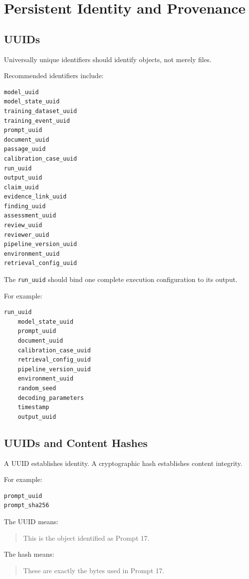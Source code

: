 \documentclass[11pt]{report}
\newcommand{\code}[1]{\texttt{#1}}
\begin{document}
\chapter{Persistent Identity and Provenance}

\section{UUIDs}

Universally unique identifiers should identify objects, not merely files.

Recommended identifiers include:

\begin{verbatim}
model_uuid
model_state_uuid
training_dataset_uuid
training_event_uuid
prompt_uuid
document_uuid
passage_uuid
calibration_case_uuid
run_uuid
output_uuid
claim_uuid
evidence_link_uuid
finding_uuid
assessment_uuid
review_uuid
reviewer_uuid
pipeline_version_uuid
environment_uuid
retrieval_config_uuid
\end{verbatim}

The \code{run\_uuid} should bind one complete execution configuration to its output.

For example:

\begin{verbatim}
run_uuid
    model_state_uuid
    prompt_uuid
    document_uuid
    calibration_case_uuid
    retrieval_config_uuid
    pipeline_version_uuid
    environment_uuid
    random_seed
    decoding_parameters
    timestamp
    output_uuid
\end{verbatim}

\section{UUIDs and Content Hashes}

A UUID establishes identity. A cryptographic hash establishes content integrity.

For example:

\begin{verbatim}
prompt_uuid
prompt_sha256
\end{verbatim}

The UUID means:

\begin{quote}
This is the object identified as Prompt 17.
\end{quote}

The hash means:

\begin{quote}
These are exactly the bytes used in Prompt 17.
\end{quote}
\end{document}
